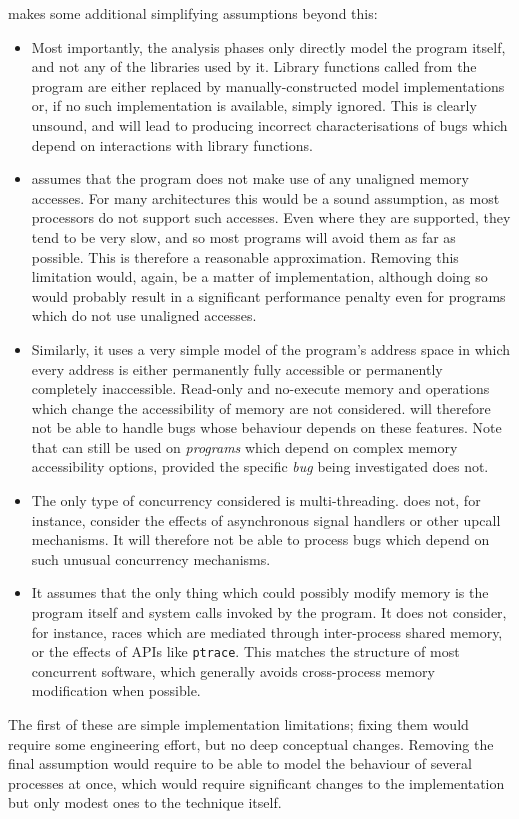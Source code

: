 {\Implementation} makes some additional simplifying assumptions beyond
this:
\begin{itemize}
\item Most importantly, the analysis phases only directly model the
  program itself, and not any of the libraries used by it.  Library
  functions called from the program are either replaced by
  manually-constructed model implementations or, if no such
  implementation is available, simply ignored.  This is clearly
  unsound, and will lead to {\implementation} producing incorrect
  characterisations of bugs which depend on interactions with library
  functions.

\item {\Implementation} assumes that the program does not make use of
  any unaligned memory accesses.  For many architectures this would be
  a sound assumption, as most processors do not support such accesses.
  Even where they are supported, they tend to be very slow, and so
  most programs will avoid them as far as
  possible.  This is therefore a reasonable
  approximation.  Removing this limitation would, again, be a matter
  of implementation, although doing so would probably result in a
  significant performance penalty even for programs which do not use
  unaligned accesses.

\item Similarly, it uses a very simple model of the program's address
  space in which every address is either permanently fully accessible
  or permanently completely inaccessible.  Read-only and no-execute
  memory and operations which change the accessibility of memory are
  not considered.  {\Implementation} will therefore not be able to
  handle bugs whose behaviour depends on these features.  Note that
  {\implementation} can still be used on \emph{programs} which depend
  on complex memory accessibility options, provided the specific
  \emph{bug} being investigated does not.

\item The only type of concurrency considered is multi-threading.
  {\Implementation} does not, for instance, consider the effects of
  asynchronous signal handlers or other upcall mechanisms.  It will
  therefore not be able to process bugs which depend on such unusual
  concurrency mechanisms.

\item It assumes that the only thing which could possibly modify
  memory is the program itself and system calls invoked by the
  program.  It does not consider, for instance, races which are
  mediated through inter-process shared memory, or the effects of APIs
  like \texttt{ptrace}.  This matches the structure of most concurrent
  software, which generally avoids cross-process memory modification
  when possible\needCite{}.
\end{itemize}
The first of these are simple implementation limitations; fixing them
would require some engineering effort, but no deep conceptual changes.
Removing the final assumption would require {\implementation} to be
able to model the behaviour of several processes at once, which would
require significant changes to the implementation but only modest ones
to the {\technique} technique itself.

